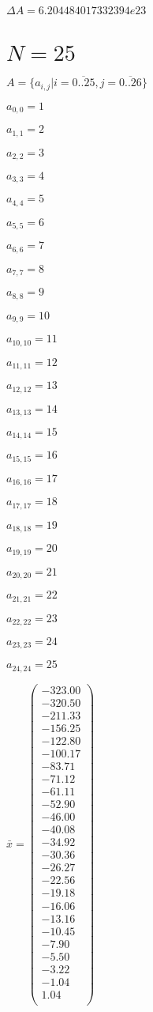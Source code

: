 \documentclass[a4paper,12pt]{article}
\begin{document}
$\Delta A = 6.204484017332394e23$



\section{ $N = 25$ }
$A = \{ a _{ i, j } | i = \overline { 0..25 }, j = \overline { 0..26 } \}$

$a _{ 0, 0 } = 1$

$a _{ 1, 1 } = 2$

$a _{ 2, 2 } = 3$

$a _{ 3, 3 } = 4$

$a _{ 4, 4 } = 5$

$a _{ 5, 5 } = 6$

$a _{ 6, 6 } = 7$

$a _{ 7, 7 } = 8$

$a _{ 8, 8 } = 9$

$a _{ 9, 9 } = 10$

$a _{ 10, 10 } = 11$

$a _{ 11, 11 } = 12$

$a _{ 12, 12 } = 13$

$a _{ 13, 13 } = 14$

$a _{ 14, 14 } = 15$

$a _{ 15, 15 } = 16$

$a _{ 16, 16 } = 17$

$a _{ 17, 17 } = 18$

$a _{ 18, 18 } = 19$

$a _{ 19, 19 } = 20$

$a _{ 20, 20 } = 21$

$a _{ 21, 21 } = 22$

$a _{ 22, 22 } = 23$

$a _{ 23, 23 } = 24$

$a _{ 24, 24 } = 25$

$\bar { x } = \begin{pmatrix}
-323.00 \\
-320.50 \\
-211.33 \\
-156.25 \\
-122.80 \\
-100.17 \\
-83.71 \\
-71.12 \\
-61.11 \\
-52.90 \\
-46.00 \\
-40.08 \\
-34.92 \\
-30.36 \\
-26.27 \\
-22.56 \\
-19.18 \\
-16.06 \\
-13.16 \\
-10.45 \\
-7.90 \\
-5.50 \\
-3.22 \\
-1.04 \\
1.04 \\
\end{pmatrix}
$
\end{document}

